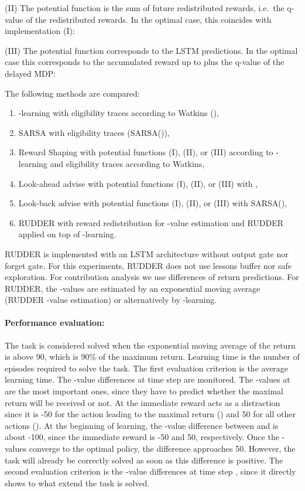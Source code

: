 \documentclass{article}
\begin{document}
\begin{appendices}
(II) The potential function  is the sum of 
future redistributed rewards, i.e.\ 
the q-value of the redistributed rewards. 
In the optimal case, this coincides with implementation (I):

(III) The potential function  corresponds to the LSTM predictions. In the optimal case this corresponds
to the accumulated reward up to  plus the q-value of the delayed MDP:





The following methods are compared:
\begin{enumerate}
    \item -learning with eligibility traces according to Watkins (), 
    \item SARSA with eligibility traces (SARSA()),
    \item Reward Shaping with potential functions (I), (II), or (III) 
    according to -learning and eligibility traces according to Watkins,
    \item Look-ahead advise with potential functions (I), (II), or (III) 
    with ,
    \item Look-back advise with potential functions (I), (II), or (III) 
    with SARSA(),
    \item RUDDER with reward redistribution for -value estimation and RUDDER applied on top of -learning.
\end{enumerate}

RUDDER is implemented with an LSTM architecture 
without output gate nor forget gate. For this experiments, 
RUDDER does not use lessons buffer nor safe exploration. 
For contribution analysis we use differences of return predictions.
For RUDDER, the -values are estimated by an exponential moving average 
(RUDDER -value estimation) or alternatively by -learning. 

\paragraph{ Performance evaluation: }
The task is considered solved when the exponential moving average of the return 
is above 90, which is 90\% of the maximum return. 
Learning time is the number of episodes required to solve the task. 
The first evaluation criterion is the average learning time.
The -value differences at time step  are monitored. 
The -values at  are the most important ones, since they have to predict 
whether the maximal return will be received or not.
At  the immediate reward acts as a distraction since it is -50 for the action leading  
to the maximal return () and 50 for all other actions ().  
At the beginning of learning, the -value difference 
between  and  is about -100, since the immediate reward is -50 and 50, respectively.
Once the -values converge to the optimal policy, the difference approaches 50. 
However, the task will already be correctly solved as soon as this difference is positive.
The second evaluation criterion is the -value differences at time step ,
since it directly shows to what extend the task is solved.


\end{appendices}
\end{document}
